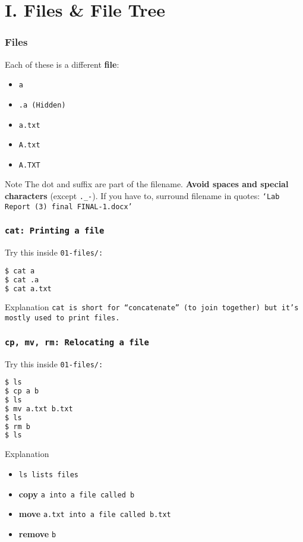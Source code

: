 \section{I. Files \& File Tree}
\begin{frame}[fragile]
\frametitle{Files}
Each of these is a different \textbf{file}:
\begin{itemize}
    \item \tt{a}
    \item \tt{.a} (Hidden)
    \item \tt{a.txt}
    \item \tt{A.txt}
    \item \tt{A.TXT}
\end{itemize}

\begin{block}{Note}
    The dot and suffix are part of the filename.
    \newline \newline
    \textbf{Avoid spaces and special characters} (except \verb|._-|).
    If you have to, surround filename in quotes:
    \tt{`Lab Report (3) final FINAL-1.docx'}
\end{block}
\end{frame}

\begin{frame}[fragile]
\frametitle{\tt{cat}: Printing a file}
Try this inside \tt{01-files/}:
\begin{lstlisting}[language=bash]
$ cat a
$ cat .a
$ cat a.txt
\end{lstlisting}
\begin{block}{Explanation}
    \tt{cat} is short for ``concatenate'' (to join together) but it's
    mostly used to print files.
\end{block}
\end{frame}

\begin{frame}[fragile]
\frametitle{\tt{cp, mv, rm}: Relocating a file}
Try this inside \tt{01-files/}:
\begin{lstlisting}[language=bash]
$ ls
$ cp a b
$ ls
$ mv a.txt b.txt
$ ls
$ rm b
$ ls
\end{lstlisting}
\begin{block}{Explanation}
    \begin{itemize}
        \item \tt{ls} lists files
        \item \textbf{copy} \tt{a} into a file called \tt{b}
        \item \textbf{move} \tt{a.txt} into a file called \tt{b.txt}
        \item \textbf{remove} \tt{b}
    \end{itemize}
\end{block}
\end{frame}

